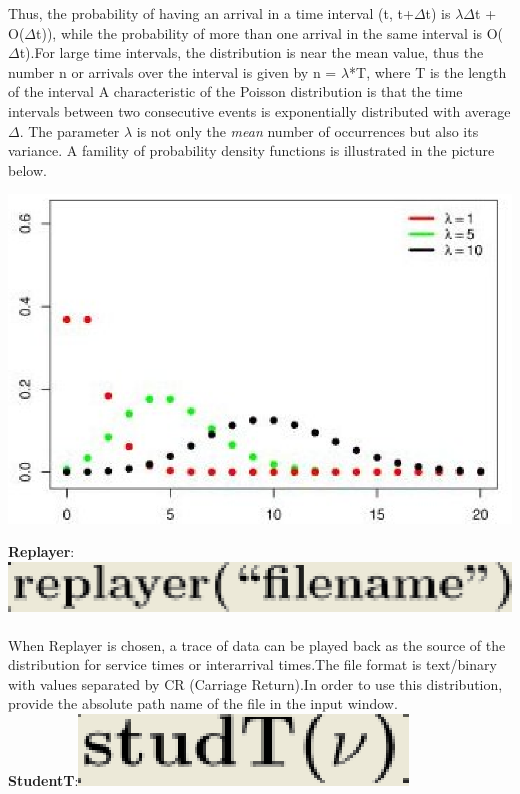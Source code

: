 Thus, the probability of having an arrival in a time interval (t, t+$\Delta$t) is $\lambda$$\Delta$t + O($\Delta$t)), while the probability of more than one  arrival in the same interval is O($\Delta$t).For large time intervals, the distribution is near the mean value, thus the number n or arrivals over the interval is given by n = $\lambda$*T, where T is the length of the interval
A characteristic of the Poisson distribution is that the time intervals between two consecutive events is exponentially distributed with average $\Delta$.
The parameter $\lambda$ is not only the \emph{mean} number of occurrences but also its variance.
A famility of probability density functions is illustrated in the picture below.\\
\begin{center}
\includegraphics[scale=.5]{img/jsim/poisson_pdf_d.eps}
\end{center}
\textbf{Replayer}: \includegraphics[scale=.5]{img/jsim/replayer_f.eps}\\\\
When Replayer is chosen, a trace of data can be played back as the source of the distribution for service times or interarrival times.The file format is text/binary with values separated by CR (Carriage Return).In order to use this distribution, provide the absolute path name of the file in the input window.\\
\textbf{StudentT}:\includegraphics[scale=.5]{img/jsim/studentT_f.eps}\\\\
$$
